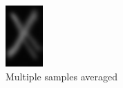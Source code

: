 \documentclass[conference]{IEEEtran}
\begin{document}
\begin{figure}[h]
\begin{subfigure}[b]{0.15\textwidth}
         \includegraphics[width=\textwidth]{tem2}
         \caption{Multiple samples averaged}
         \label{fig:tem2}
     \end{subfigure}
     \begin{subfigure}[b]{0.15\textwidth}
         \centering

\end{subfigure}
\end{figure}
\end{document}
